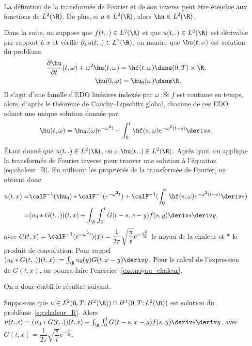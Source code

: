 \documentclass[12pt,a4paper,twoside]{article}
\begin{document}
La d\'efinition de la transform\'ee de Fourier et de son inverse peut \^etre \'etendue
aux fonctions de $L^2(\R)$. De plus, si $u \in L^2(\R)$, alors $\hu \in L^2(\R)$.

Dans la suite, on suppose que $f(t,.) \in L^2(\R)$
et que $u(t,.) \in L^2(\R)$ est d\'erivable par rapport \`a $x$ et v\'erifie
$\partial_x u(t,.) \in L^2(\R)$,
on montre que $\hu(t,\omega)$ est solution du probl\`eme
\begin{align*}
  \dfrac{\partial \hu}{\partial t}(t,\omega) + \omega^2 \hu(t , \omega) = \hf(t,\omega) 
  & \dans (0,T) \times \R ,
  \\
  \hu(0 , \omega) = \hu_0(\omega)
  & \dans \R .
\end{align*}
Il s'agit d'une famille d'EDO lin\'eaires index\'ee par $\omega$.
Si $f$ est continue en temps, alors, d'apr\`es le th\'eor\`eme de Cauchy--Lipschitz global,
chacune de ces EDO admet une unique solution donn\'ee par
\begin{align*}
  \hu(t,\omega) = \hu_0(\omega) e^{- \omega^2 t} 
  + \int_0^t \hf(s,\omega) e^{- \omega^2 (t - s)} \deriv s . 
\end{align*}

\'Etant donn\'e que $u(t,.) \in L^2(\R)$, on a $\hu(t,.) \in L^2(\R)$.
Apr\`es quoi, on applique la transform\'ee de Fourier inverse pour trouver
une solution \`a l'\'equation \eqref{eq:chaleur_R}.
En utilisant les propri\'et\'es de la transform\'ee de Fourier, on obtient donc
\begin{align*}
  u(t,x) 
  =& \calF^{-1}(\hu_0) * \calF^{-1} (e^{-\omega^2 t})
  + \calF^{-1} (\int_0^t \hf(s,\omega) e^{- \omega^2(t-s)} \deriv s)
  \\
  =& (u_0 * G(t,.))(t,x) + \int_{\R} \int_0^t G(t-s, x-y) f(s,y) \deriv s \deriv y ,
\end{align*}
avec $G(t,x) = \calF^{-1} (e^{-\omega^2 t})(x) = \dfrac{1}{2 \pi} \sqrt{\dfrac{\pi}{t}} e^{- \frac{x^2}{4t}}$
le noyau de la chaleur et $*$ le produit de convolution.
Pour rappel
$(u_0 * G(t,.))(t,x) := \int_{\R} u_0(y) G(t,x-y) \deriv y$.
Pour le calcul de l'expression de $G(t,x)$, on pourra faire l'exercice~\ref{exo:noyau_chaleur}.


On a donc \'etabli le r\'esultat suivant.
\begin{theorem}
  Supposons que $u \in L^2(0,T;H^2(\R)) \cap H^1(0,T;L^2(\R))$ est solution
  du probl\`eme~\eqref{eq:chaleur_R}.
  Alors $u(t,x) = (u_0 * G(t,.))(t,x) + \int_{\R} \int_0^t G(t-s, x-y) f(s,y) \deriv s \deriv y$,
  avec $G(t,x) = \dfrac{1}{2 \pi} \sqrt{\dfrac{\pi}{t}} e^{- \frac{x^2}{4t}}$.
\end{theorem}
\end{document}
